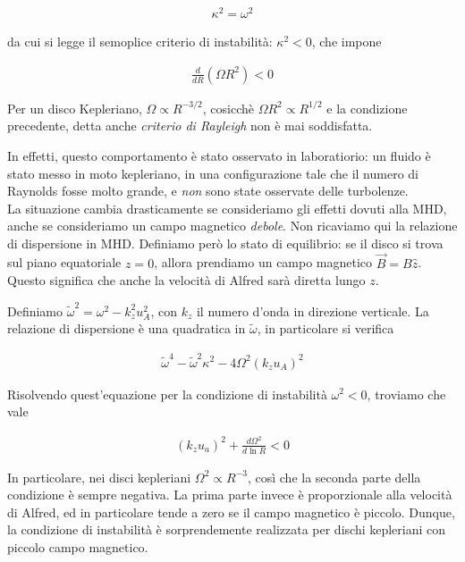 \documentclass{report}
\begin{document}
\begin{align}
    \kappa^2 = \omega^2
\end{align}

da cui si legge il semoplice criterio di instabilità: \(\kappa^2 < 0\), che impone 

\begin{align}
    \frac{d}{dR}(\Omega R^2) < 0
\end{align}

Per un disco Kepleriano, \(\Omega \propto R^{-3/2}\), cosicchè \(\Omega R^2 \propto R^{1/2}\) e la condizione precedente, detta anche \emph{criterio di Rayleigh} non è mai soddisfatta. 

In effetti, questo comportamento è stato osservato in laboratiorio: un fluido è stato messo in moto kepleriano, in una configurazione tale che il numero di Raynolds fosse molto grande, e \emph{non} sono state osservate delle turbolenze. \\

La situazione cambia drasticamente se consideriamo gli effetti dovuti alla MHD, anche se consideriamo un campo magnetico \emph{debole}. Non ricaviamo qui la relazione di dispersione in MHD. Definiamo però lo stato di equilibrio: se il disco si trova sul piano equatoriale \(z=0\), allora prendiamo un campo magnetico \(\vec{B} = B\hat{z}\). Questo significa che anche la velocità di Alfred sarà diretta lungo \(z\). 

Definiamo \(\tilde{\omega}^2 = \omega^2 - k_z^2 u_A^2\), con \(k_z\) il numero d'onda in direzione verticale. La relazione di dispersione è una quadratica in \(\tilde{\omega}\), in particolare si verifica 

\begin{align}
    \tilde{\omega}^4 - \tilde{\omega}^2 \kappa^2 -4\Omega^2(k_zu_A)^2
\end{align}

Risolvendo quest'equazione per la condizione di instabilità \(\omega^2 <0\), troviamo che vale 

\begin{align}
    (k_z u_a)^2 + \frac{d\Omega^2}{d\ln R} <0 
\end{align}

In particolare, nei disci kepleriani \(\Omega^2 \propto R^{-3}\), così che la seconda parte della condizione è sempre negativa. La prima parte invece è proporzionale alla velocità di Alfred, ed in particolare tende a zero se il campo magnetico è piccolo. Dunque, la condizione di instabilità è sorprendemente realizzata per dischi kepleriani con piccolo campo magnetico. \\
\end{document}
